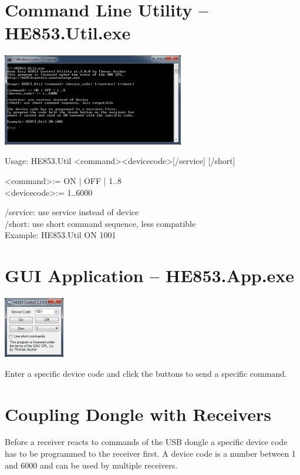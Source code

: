 \documentclass[
a4paper,
oneside,
halfparskip*,
normalheadings,
]
{scrbook}
\begin{document}
\section{Command Line Utility -- HE853.Util.exe}

\includegraphics[width=300px]{cmd.png}

Usage: HE853.Util \textless command\textgreater \textless device\textunderscore code\textgreater [/service] [/short]

\textless command\textgreater := ON | OFF | 1..8 \\
\textless device\textunderscore code\textgreater := 1..6000

/service: use service instead of device \\
/short: use short command sequence, less compatible \\

Example: HE853.Util ON 1001

\section{GUI Application -- HE853.App.exe}

\includegraphics[width=100px]{gui.png}

Enter a specific device code and click the buttons to send a specific command.

\section{Coupling Dongle with Receivers}

Before a receiver reacts to commands of the USB dongle a specific device code has to be
programmed to the receiver first. A device code is a number between 1 and 6000 and can
be used by multiple receivers.
\end{document}
